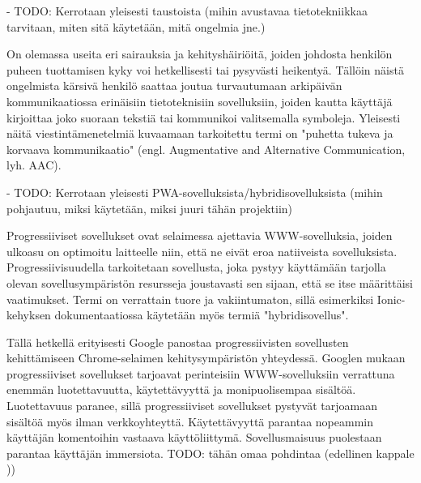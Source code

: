 \documentclass[utf8]{gradu3}
\begin{document}
- TODO: Kerrotaan yleisesti taustoista (mihin avustavaa tietotekniikkaa tarvitaan, miten sitä käytetään, mitä ongelmia jne.)

On olemassa useita eri sairauksia ja kehityshäiriöitä, joiden johdosta henkilön puheen tuottamisen kyky voi hetkellisesti tai pysyvästi heikentyä. Tällöin näistä ongelmista kärsivä henkilö saattaa joutua turvautumaan arkipäivän kommunikaatiossa erinäisiin tietoteknisiin sovelluksiin, joiden kautta käyttäjä kirjoittaa joko suoraan tekstiä tai kommunikoi valitsemalla symboleja. Yleisesti näitä viestintämenetelmiä kuvaamaan tarkoitettu termi on "puhetta tukeva ja korvaava kommunikaatio" (engl. Augmentative and Alternative Communication, lyh. AAC).

- TODO: Kerrotaan yleisesti PWA-sovelluksista/hybridisovelluksista (mihin pohjautuu, miksi käytetään, miksi juuri tähän projektiin)

Progressiiviset sovellukset ovat selaimessa ajettavia WWW-sovelluksia, joiden ulkoasu on optimoitu laitteelle niin, että ne eivät eroa natiiveista sovelluksista. Progressiivisuudella tarkoitetaan sovellusta, joka pystyy käyttämään tarjolla olevan sovellusympäristön resursseja joustavasti sen sijaan, että se itse määrittäisi vaatimukset. Termi on verrattain tuore ja vakiintumaton, sillä esimerkiksi Ionic-kehyksen dokumentaatiossa käytetään myös termiä "hybridisovellus".

Tällä hetkellä erityisesti Google panostaa progressiivisten sovellusten kehittämiseen Chrome-selaimen kehitysympäristön yhteydessä. Googlen mukaan progressiiviset sovellukset tarjoavat perinteisiin WWW-sovelluksiin verrattuna enemmän luotettavuutta, käytettävyyttä ja monipuolisempaa sisältöä. Luotettavuus paranee, sillä progressiiviset sovellukset pystyvät tarjoamaan sisältöä myös ilman verkkoyhteyttä. Käytettävyyttä parantaa nopeammin käyttäjän komentoihin vastaava käyttöliittymä. Sovellusmaisuus puolestaan parantaa käyttäjän immersiota. TODO: tähän omaa pohdintaa (edellinen kappale \parencite[]{google-pwa-marketing}))
\end{document}
